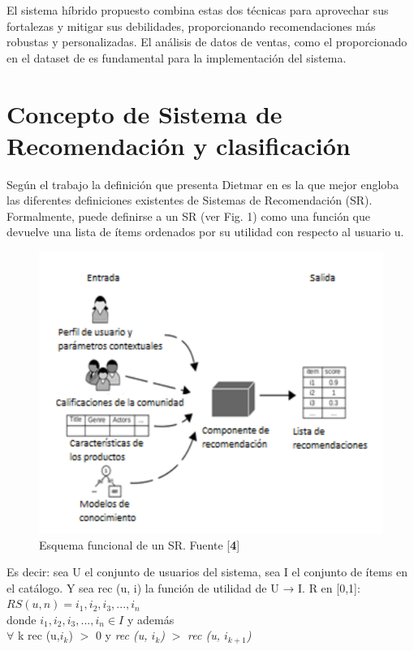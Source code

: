 \documentclass{llncs}
\begin{document}
El sistema híbrido propuesto combina estas dos técnicas para aprovechar sus fortalezas y mitigar sus debilidades, proporcionando recomendaciones más robustas y personalizadas. El análisis de datos de ventas, como el proporcionado en el dataset de \cite{2} es fundamental para la implementación del sistema.

\section{Concepto de Sistema de Recomendación y clasificación}
Según el trabajo \cite{3} la definición que presenta Dietmar en \cite{4} es la que mejor engloba las diferentes definiciones existentes de Sistemas de Recomendación (SR).\\

Formalmente, puede definirse a un SR (ver Fig. 1) como una función que devuelve una lista de ítems ordenados por su utilidad con respecto al usuario u.
\begin{figure}[h] \centering \includegraphics[width=\textwidth]{esquema} \caption{Esquema funcional de un SR. Fuente [\textbf{4}]} \label{fig:etiqueta} \end{figure}

Es decir: sea U el conjunto de usuarios del sistema, sea I el conjunto de ítems en el catálogo. Y sea rec (u, i) la función de utilidad de U → I. R en [0,1]:\\
$RS(u,n) = {i_1, i_2, i_3,...,i_n}$\\
donde $i_1, i_2, i_3,..., i_n \in \textit{I}$ y además\\
$\forall$ k rec (u,$i_k$) $>$ 0 y \textit{rec (u, $i_k$)} $>$ \textit{rec (u, $i_{k+1}$)}\\
\end{document}
